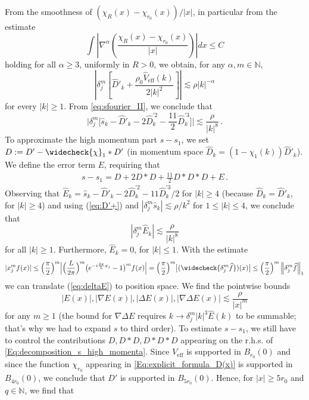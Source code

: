 \documentclass[a4paper,11pt]{article}
\numberwithin{equation}{section}
\begin{document}
From the smoothness of $(\chi_R(x) - \chi_{r_0}(x))/|x|$, in particular from the estimate \[ \int \left|\nabla^\alpha \left(\frac{\chi_R(x)-\chi_{r_0}(x)}{|x|}\right)\right| dx\leq C \] holding for all $\alpha  \geq 3$, uniformly in $R>0$, we obtain, for any $\alpha,m\in \mathbb N$, 
\begin{equation}\label{eq:D'+}
\left|\delta^m_j \left[\widehat{D}'_k +\frac{\rho_0 \widehat{V}_\mathrm{eff}(k)}{2|k|^2}\right]\right|
\lesssim \rho |k|^{-\alpha}
\end{equation}
for every $|k| \geq 1$. From \eqref{eq:sfourier_II}, we conclude that 
\[ \Big| \delta_j^m \Big[ \widehat{s}_k - \widehat{D}'_k - 2 \widehat{D}^{'2}_k - \frac{11}{2} \widehat{D}^{'3}_k \Big] \Big| \lesssim \frac{\rho}{|k|^8} \,. \]
To approximate the high momentum part $s-s_1$, we set $D := D' - \widecheck{\chi}_1 * D'$ (in momentum space $\widehat{D}_k = (1- \chi_1 (k)) \widehat{D}'_k$). We define the error term $E$, requiring that 
\begin{align}
\label{Eq:decomposition_s_high_momenta}
   s-s_1 = D + 2 D*D + \frac{11}{2}D*D*D + E \,.
\end{align}
Observing that $\widehat{E}_k = \widehat{s}_k - \widehat{D}'_k - 2 \widehat{D}^{'2}_k - 11 \widehat{D}^{'3}_k /2$ for $|k| \geq 4$ (because $\widehat{D}_k = \widehat{D}'_k$, for $|k| \geq 4$) and using (\ref{eq:D'+}) and $|\delta_j^m \widehat{s}_k| \lesssim \rho / k^2$ for $1 \leq |k| \leq 4$, we conclude that  
\begin{equation}\label{eq:deltaE} |\delta_j^m \widehat{E}_k| \lesssim \frac{\rho}{|k|^8} \end{equation}
for all $|k| \geq 1$. Furthermore, $\widehat{E}_k = 0$, for $|k| \leq 1$. With the estimate 
 \begin{equation*}
        |x_j^m f(x)|\le \Big(\frac{\pi}{2}\Big)^m\Big| \Big(\frac{L}{2\pi}\Big)^m\big(e^{-i\frac{2\pi}{L}x_j}-1\big)^m f(x)\Big|=\Big(\frac{\pi}{2}\Big)^m  \big| (\widecheck{\delta^m_j \widehat{f}} ) (x)\big|\leq \Big(\frac{\pi}{2}\Big)^m \left\|\delta^m_j \widehat{f} \right\|_1 
    \end{equation*}
we can translate (\ref{eq:deltaE}) to position space. We find the pointwise bounds
\[ |E(x)|, |\nabla E(x)| , |\Delta E (x)| , |\nabla \Delta E (x)| \lesssim \frac{\rho}{|x|^m}\]
for any $m \geq 1$ (the bound for $\nabla \Delta E$ requires $k \to \delta_j^m |k|^3 \widehat{E} (k)$ to be summable; that's why we had to expand $s$ to third order). To estimate $s-s_1$, we still have to control the contributions $D, D*D, D*D*D$ appearing on the r.h.s. of  \eqref{Eq:decomposition_s_high_momenta}. Since $V_\mathrm{eff}$ is supported in $B_{r_0}(0)$ and since the function $\chi_{r_0}$ appearing in \eqref{Eq:explicit_formula_D(x)} is supported in $B_{4r_0}(0)$, we conclude that $D'$ is supported in $B_{5r_0}(0)$. Hence, for $|x| \geq 5r_0$ and $q\in \mathbb N$, we find that
\end{document}

